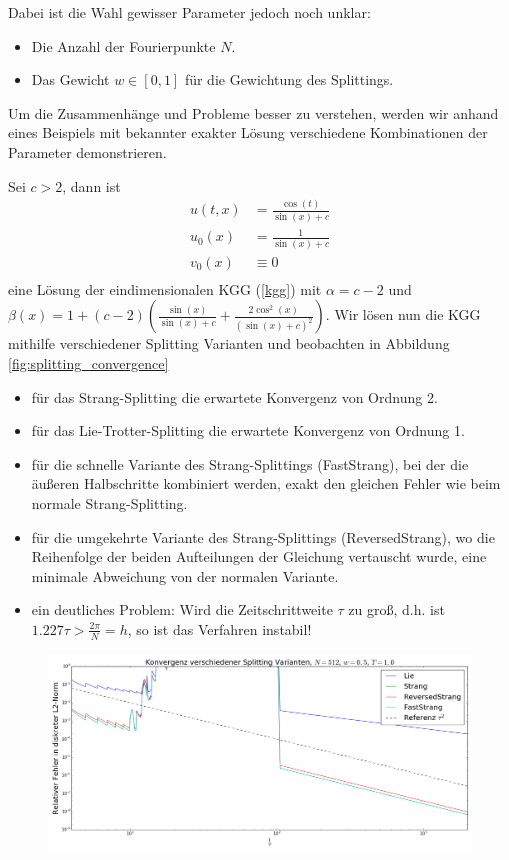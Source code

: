 Dabei ist die Wahl gewisser Parameter jedoch noch unklar:
\begin{itemize}
\item Die Anzahl der Fourierpunkte $N$.
\item Das Gewicht $w\in[0,1]$ für die Gewichtung des Splittings. 
\end{itemize}
Um die Zusammenhänge und Probleme besser zu verstehen, werden wir anhand eines Beispiels mit bekannter exakter Lösung verschiedene Kombinationen der Parameter demonstrieren.
\begin{mathbsp}
\label{bsp:trialfrog2}
Sei $c>2$, dann ist
\begin{align*}
u(t,x)&=\frac{\cos(t)}{\sin(x)+c}\\
u_0(x)&=\frac{1}{\sin(x)+c}\\
v_0(x)&\equiv 0\\
\end{align*}
eine Lösung der eindimensionalen KGG (\ref{kgg}) mit $\alpha=c-2$ und $\beta(x)=1+(c-2)\left(\frac{\sin(x)}{\sin(x)+c}+\frac{2\cos^2(x)}{(\sin(x)+c)^2}\right)$. Wir lösen nun die KGG mithilfe verschiedener Splitting Varianten und beobachten in Abbildung \ref{fig:splitting_convergence}
\begin{itemize}
\item für das Strang-Splitting die erwartete Konvergenz von Ordnung 2.
\item für das Lie-Trotter-Splitting die erwartete Konvergenz von Ordnung 1.
\item für die schnelle Variante des Strang-Splittings (FastStrang), bei der die äußeren Halbschritte kombiniert werden, exakt den gleichen Fehler wie beim normale Strang-Splitting.
\item für die umgekehrte Variante des Strang-Splittings (ReversedStrang), wo die Reihenfolge der beiden Aufteilungen der Gleichung vertauscht wurde, eine minimale Abweichung von der normalen Variante.
\item ein deutliches Problem: Wird die Zeitschrittweite $\tau$ zu groß, d.h. ist $1.227\tau>\frac{2\pi}{N}=h$, so ist das Verfahren instabil!
\end{itemize}
\begin{figure}[!htb]
\includegraphics[width=\textwidth]{Figures/splitting_convergence_fix_weight_frog2_cfl.png}

\end{figure}
\end{mathbsp}
